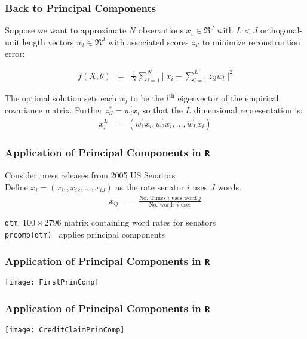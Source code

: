 \begin{frame}[fragile]
\frametitle{Back to Principal Components}


\begin{thm}
Suppose we want to approximate $N$ observations ${x}_{i} \in \Re^{J}$ with $L < J$ orthogonal-unit length vectors ${w}_{l} \in \Re^{J}$ with associated scores $z_{il}$ to minimize reconstruction error:  

\begin{eqnarray}
f({X}, {\theta}) & = & \frac{1}{N} \sum_{i=1}^{N} || {x}_{i}  - \sum_{l = 1}^{L} z_{il} {w}_{l}||^{2} \nonumber
\end{eqnarray}

The optimal solution sets each ${w}_{l}$ to be the $l^{\text{th}}$ eigenvector of the empirical covariance matrix. Further $z_{il}^{*} = {w}_{l}^{'}{x}_{i}$ so that the $L$ dimensional representation is:
\begin{eqnarray}
{x}^{L}_{i} & = & ({w}_{1}^{'}{x}_{i}, {w}_{2}^{'}{x}_{i}, \hdots, {w}_{L}^{'}{x}_{i} ) \nonumber  
\end{eqnarray}

\end{thm}

\end{frame}



\begin{frame}[fragile]
\frametitle{Application of Principal Components in {\tt R}}

Consider press releases from 2005 US Senators  \\
Define ${x}_{i} = (x_{i1}, x_{i2}, \hdots, x_{iJ})$ as the rate senator $i$ uses $J$ words.  
\begin{eqnarray}
x_{ij} & = & \frac{\text{No. Times $i$ uses word $j$}}{\text{No. words $i$ uses}} \nonumber
\end{eqnarray}

{\tt  dtm}: $100 \times 2796$ matrix containing word rates for senators\\  
{\tt prcomp(dtm) } applies principal components


\end{frame}


\begin{frame}[fragile]
\frametitle{Application of Principal Components in {\tt R}}
\texttt{[image: FirstPrinComp]}
\end{frame}

\begin{frame}[fragile]
\frametitle{Application of Principal Components in {\tt R}}
\texttt{[image: CreditClaimPrinComp]}
\end{frame}


